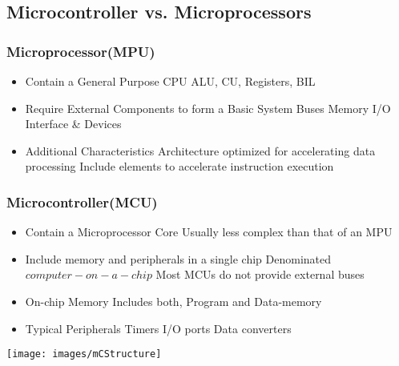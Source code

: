 \subsection{Microcontroller vs. Microprocessors }
\begin{multicols}{2}
		\subsubsection{Microprocessor(MPU) }
		\begin{itemize}
			\item Contain a General Purpose CPU
			\subitem ALU, CU, Registers, BIL %
			\item Require External Components to form a Basic System
			\subitem Buses
			\subitem Memory
			\subitem I/O Interface \& Devices
			\item Additional Characteristics
			\subitem Architecture optimized for accelerating data processing
			\subitem Include elements to accelerate instruction execution  
		\end{itemize}
\subsubsection{Microcontroller(MCU)}
		\begin{itemize}
			\item Contain a Microprocessor Core
			\subitem Usually less complex than that of an MPU
			\item Include memory and peripherals in a single chip
			\subitem Denominated $ computer-on-a-chip $ 
			\subitem Most MCUs do not provide external buses
			\item On-chip Memory
			\subitem Includes both, Program and Data-memory
			\item Typical Peripherals
			\subitem Timers
			\subitem I/O ports
			\subitem Data converters
		\end{itemize}
\end{multicols}
\begin{center}
	\texttt{[image: images/mCStructure]}
\end{center}
\pagebreak

